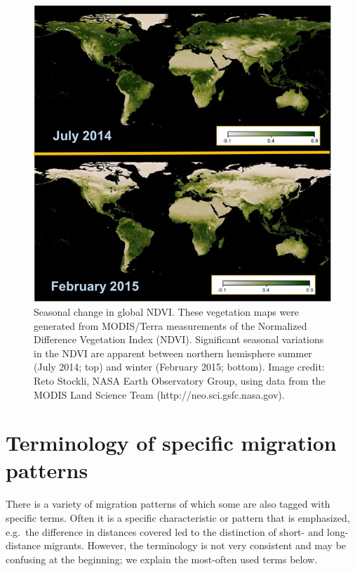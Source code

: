 \documentclass[
]{book}
\begin{document}
\begin{figure}

{\centering \includegraphics[width=0.9\linewidth]{figures/Fig_SeasonalChanges_NDVI} 

}

\caption{\label{fig:NDVIpic}Seasonal change in global NDVI. These vegetation maps were generated from MODIS/Terra measurements of the Normalized Difference Vegetation Index (NDVI). Significant seasonal variations in the NDVI are apparent between northern hemisphere summer (July 2014; top) and winter (February 2015; bottom). Image credit: Reto Stockli, NASA Earth Observatory Group, using data from the MODIS Land Science Team (http://neo.sci.gsfc.nasa.gov).}\label{fig:NDVIpic}
\end{figure}

\hypertarget{terminology-of-specific-migration-patterns}{%
\section{Terminology of specific migration patterns}\label{terminology-of-specific-migration-patterns}}

There is a variety of migration patterns of which some are also tagged with specific terms. Often it is a specific characteristic or pattern that is emphasized, e.g.~the difference in distances covered led to the distinction of short- and long-distance migrants. However, the terminology is not very consistent and may be confusing at the beginning; we explain the most-often used terms below.
\end{document}
